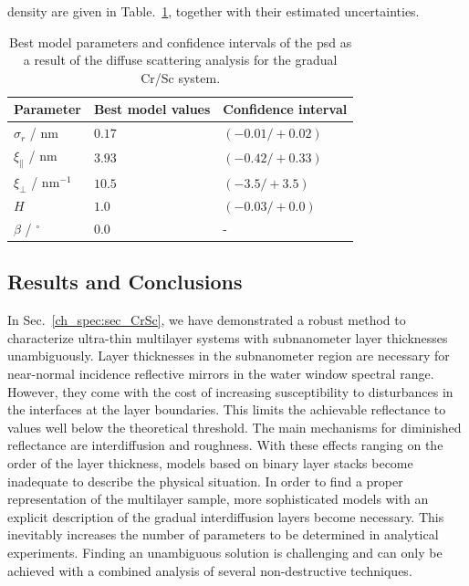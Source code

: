density are given in Table.~\ref{ch_diff:tbl_CrSc_psd_results}, together with their estimated
uncertainties.
\begin{table}
\centering
\caption{Best model parameters and confidence intervals of the \gls{psd} as a result of the diffuse scattering analysis for the gradual Cr/Sc system.}
\label{ch_diff:tbl_CrSc_psd_results}
\begin{tabular}{@{}lll@{}}
\toprule
Parameter & Best model values & Confidence interval\\ \midrule
$\sigma_r$ / nm & $0.17  $&$(-0.01/+0.02)$ \\
$\xi_\parallel$ / nm& $3.93 $&$(-0.42 / +0.33)$ \\
$\xi_\perp$  / nm$^{-1}$& $10.5 $&$ (-3.5/+3.5)$ \\
$H$ & $1.0$ & $(-0.03 /+0.0)$ \\
$\beta$ / $^\circ$ & $0.0$ & - \\
 \bottomrule
\end{tabular}
\end{table}

\subsection{Results and Conclusions}
In Sec.~\ref{ch_spec:sec_CrSc}, we have demonstrated a robust method to characterize ultra-thin 
multilayer systems with subnanometer layer thicknesses unambiguously. Layer 
thicknesses in the subnanometer region are necessary for near-normal incidence 
reflective mirrors in the water window spectral range. However, they come with 
the cost of increasing susceptibility to disturbances in the interfaces at the 
layer boundaries. This limits the achievable reflectance to values well below 
the theoretical threshold. The main mechanisms for diminished reflectance are 
interdiffusion and roughness. With these effects ranging on the order of the 
layer thickness, models based on binary layer stacks become inadequate to 
describe the physical situation. In order to find a proper representation of 
the multilayer sample, more sophisticated models with an explicit description 
of the gradual interdiffusion layers become necessary. This inevitably 
increases the number of parameters to be determined in analytical experiments. 
Finding an unambiguous solution is challenging and can only be achieved with a 
combined analysis of several non-destructive techniques.

